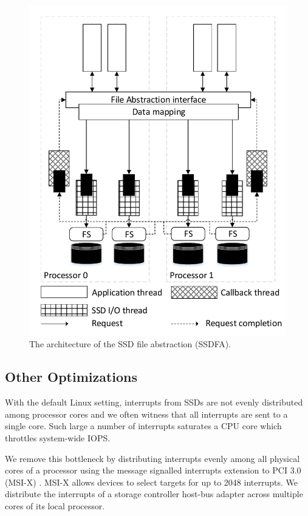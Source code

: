 \begin{figure}[t]
\centering
\includegraphics[scale=0.6]{figs/SAFS/SSD-array.pdf}
\vspace{-5pt}
\caption{The architecture of the SSD file abstraction (SSDFA).}
\vspace{-5pt}
\label{SSD_VFS}
\end{figure}

\subsection{Other Optimizations}

With the default Linux setting, interrupts from SSDs are not evenly distributed
among processor cores and we often witness that all interrupts are sent to a single core. 
Such large a number of interrupts saturates a CPU core which throttles system-wide
IOPS.

We remove this bottleneck by distributing interrupts evenly among all 
physical cores of a processor using the message signalled interrupts extension to 
PCI 3.0 (MSI-X) \cite{msix}.  MSI-X allows devices to select targets for up 
to 2048 interrupts.  We distribute the interrupts of a storage controller 
host-bus adapter across multiple cores of its local processor.

